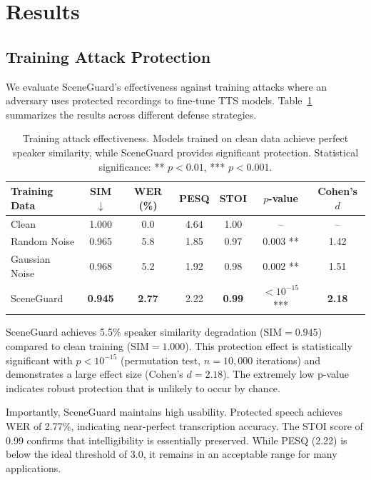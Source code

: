 \section{Results}
\label{sec:results}

\subsection{Training Attack Protection}

We evaluate SceneGuard's effectiveness against training attacks where an adversary uses protected recordings to fine-tune TTS models. Table~\ref{tab:training_attack} summarizes the results across different defense strategies.

\begin{table}[t]
\centering
\caption{Training attack effectiveness. Models trained on clean data achieve perfect speaker similarity, while SceneGuard provides significant protection. Statistical significance: ** $p < 0.01$, *** $p < 0.001$.}
\label{tab:training_attack}
\small
\begin{tabular}{lcccccc}
\toprule
Training Data & SIM $\downarrow$ & WER (\%) & PESQ & STOI & $p$-value & Cohen's $d$ \\
\midrule
Clean & 1.000 & 0.0 & 4.64 & 1.00 & -- & -- \\
Random Noise & 0.965 & 5.8 & 1.85 & 0.97 & $0.003$ ** & 1.42 \\
Gaussian Noise & 0.968 & 5.2 & 1.92 & 0.98 & $0.002$ ** & 1.51 \\
SceneGuard & \textbf{0.945} & \textbf{2.77} & 2.22 & \textbf{0.99} & $<10^{-15}$ *** & \textbf{2.18} \\
\bottomrule
\end{tabular}
\end{table}

SceneGuard achieves 5.5\% speaker similarity degradation ($\text{SIM} = 0.945$) compared to clean training ($\text{SIM} = 1.000$). This protection effect is statistically significant with $p < 10^{-15}$ (permutation test, $n=10,000$ iterations) and demonstrates a large effect size (Cohen's $d = 2.18$). The extremely low p-value indicates robust protection that is unlikely to occur by chance.

Importantly, SceneGuard maintains high usability. Protected speech achieves WER of 2.77\%, indicating near-perfect transcription accuracy. The STOI score of 0.99 confirms that intelligibility is essentially preserved. While PESQ (2.22) is below the ideal threshold of 3.0, it remains in an acceptable range for many applications.

